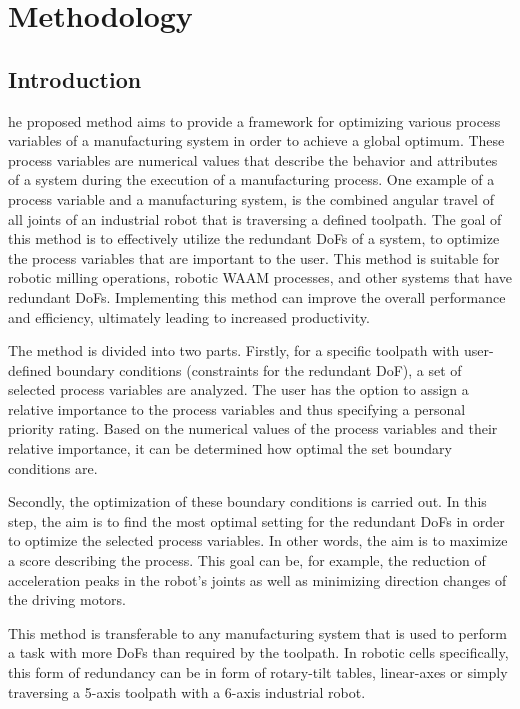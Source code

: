 \documentclass[conference]{IEEEtran}
\begin{document}
\section{Methodology}
\subsection{Introduction}
he proposed method aims to provide a framework for optimizing various process variables of a manufacturing system in order to achieve a global optimum. These process variables are numerical values that describe the behavior and attributes of a system during the execution of a manufacturing process. One example of a process variable and a manufacturing system, is the combined angular travel of all joints of an industrial robot that is traversing a defined toolpath.
The goal of this method is to effectively utilize the redundant DoFs of a system, to optimize the process variables that are important to the user. This method is suitable for robotic milling operations, robotic WAAM processes, and other systems that have redundant DoFs. Implementing this method can improve the overall performance and efficiency, ultimately leading to increased productivity.

The method is divided into two parts. Firstly, for a specific toolpath with user-defined boundary conditions (constraints for the redundant DoF), a set of selected process variables are analyzed. 
The user has the option to assign a relative importance to the process variables and thus specifying a personal priority rating. Based on the numerical values of the process variables and their relative importance, it can be determined how optimal the set boundary conditions are.

Secondly, the optimization of these boundary conditions is carried out. In this step, the aim is to find the most optimal setting for the redundant DoFs in order to optimize the selected process variables. In other words, the aim is to maximize a score describing the process. This goal can be, for example, the reduction of acceleration peaks in the robot's joints as well as minimizing direction changes of the driving motors.

This method is transferable to any manufacturing system that is used to perform a task with more DoFs than required by the toolpath. In robotic cells specifically, this form of redundancy can be in form of rotary-tilt tables, linear-axes or simply traversing a 5-axis toolpath with a 6-axis industrial robot. 
\end{document}
